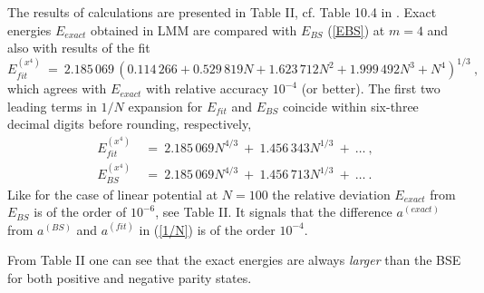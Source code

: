 \documentclass[preprint,preprintnumbers,amsmath,amssymb]{revtex4}
\begin{document}
The results of calculations are presented in Table II, cf. Table 10.4 in \cite{Bender-Orszag:1978}. Exact energies $E_{exact}$ obtained in LMM are compared with $E_{BS}$ (\ref{EBS}) at $m=4$ and also with results of the fit
\begin{equation}
	E_{fit}^{(x^4)}\  =\ 2.185\,069 \,\left(0.114\,266 + 0.529\,819 N + 1.623\,712 N^2 +
                         1.999\,492 N^3 + N^4\right)^{1/3}\ ,
\end{equation}
which agrees with $E_{exact}$ with relative accuracy $10^{-4}$ (or better). The first two leading terms in $1/N$ expansion for $E_{fit}$ and $E_{BS}$ coincide within six-three decimal digits before rounding, respectively,
\begin{align*}
    E_{fit}^{(x^4)}\  &=\   2.185\,069N^{4/3}\  +\   1.456\,343 N^{1/3}\  + \ \ldots \ ,\\
    E_{BS}^{(x^4)}\ &=\  2.185\,069N^{4/3}\ +\  1.456\,713N^{1/3}\  + \ \ldots \ .
\end{align*}
Like for the case of linear potential at $N=100$ the relative deviation $E_{exact}$ from $E_{BS}$ is of the order of $10^{-6}$, see Table II. It signals that the difference $a^{(exact)}$ from $a^{(BS)}$ and $a^{(fit)}$ in (\ref{1/N}) is of the order $10^{-4}$.

From Table II one can see that the exact energies are always {\it larger} than the BSE for both positive and negative parity states.
\end{document}
